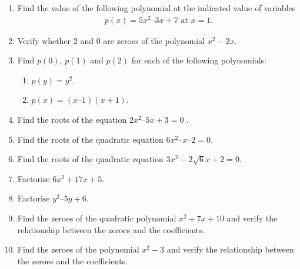 \renewcommand{\theequation}{\theenumi}
\begin{enumerate}[label=\arabic*.,ref=\thesubsection.\theenumi]
%
%
\item Find the value of  the following polynomial at the indicated value of variables 
\begin{align}
p(x) = 5x^2– 3x + 7 \text{  at } x = 1.
\end{align}
\item Verify whether 2 and 0 are zeroes of the polynomial $x^2-2x$.
\\
\solution 

\item Find $p(0)$, $p(1)$ and $p(2)$ for each of the following polynomials: 
\begin{enumerate}
\item $p(y) = y^2$. 
\item $p(x) = (x – 1) (x + 1)$.
\end{enumerate}
\solution 

\item Find the roots of the equation  $2x^2– 5x + 3 = 0$ .
\item Find the roots of the quadratic equation $6x^2– x – 2 = 0.$
\item Find the roots of the quadratic equation $3x^2 -2 \sqrt{6}x+ 2 = 0$.
\\
\solution 

%
%
\item Factorise $6x^2+ 17x + 5$.
\item Factorise $y^2 – 5y + 6$.
\item Find the zeroes of the quadratic polynomial $x^2+7x+10$ and verify the relationship between the zeroes and the coefficients.
\item Find the zeroes of the polynomial $x^2-3$ and verify the relationship between the zeroes and the coefficients.

\end{enumerate}
